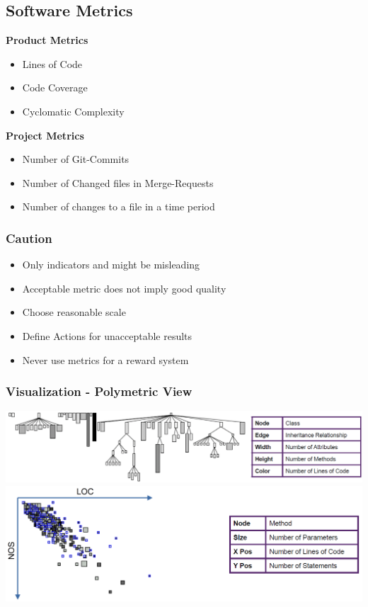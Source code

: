 \subsection{Software Metrics}
\textbf{Product Metrics}
\begin{itemize}
    \item Lines of Code
    \item Code Coverage
    \item Cyclomatic Complexity
\end{itemize}
\textbf{Project Metrics}
\begin{itemize}
    \item Number of Git-Commits
    \item Number of Changed files in Merge-Requests
    \item Number of changes to a file in a time period
\end{itemize}

\subsubsection{Caution}
\begin{itemize}
    \item Only indicators and might be misleading
    \item Acceptable metric does not imply good quality
    \item Choose reasonable scale
    \item Define Actions for unacceptable results
    \item Never use metrics for a reward system
\end{itemize}

\subsubsection{Visualization - Polymetric View}
\includegraphics[width=\linewidth]{../img/polymetric_view_1.png}
\includegraphics[width=\linewidth]{../img/polymetric_view_2.png}



















